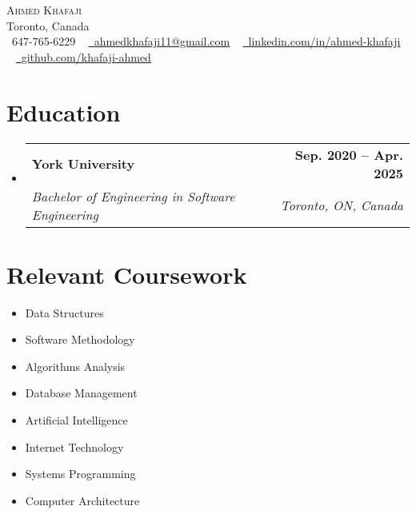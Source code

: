 \documentclass[letterpaper,11pt]{article}
\makeatletter
\newcommand{\resumeItem}[1]{
  \item\small{
    {#1 \vspace{-2pt}}
  }
}
\newcommand{\resumeSubheading}[4]{
  \vspace{-2pt}\item
    \begin{tabular*}{1.0\textwidth}[t]{l@{\extracolsep{\fill}}r}
      \textbf{#1} & \textbf{\small #2} \\
      \textit{\small#3} & \textit{\small #4} \\
    \end{tabular*}\vspace{-7pt}
}
\newcommand{\resumeSubHeadingListStart}{\begin{itemize}[leftmargin=0.0in, label={}]}
\newcommand{\resumeSubHeadingListEnd}{\end{itemize}}
\newcommand{\resumeItemListStart}{\begin{itemize}}
\newcommand{\resumeItemListEnd}{\end{itemize}\vspace{-5pt}}
\makeatother
\begin{document}
\begin{center}
    {\Huge \scshape Ahmed Khafaji} \\ \vspace{1pt}
    Toronto, Canada \\ \vspace{1pt}
    \small \raisebox{-0.1\height}\faPhone\ 647-765-6229 ~ 
    \href{mailto:ahmedkhafaji11@gmail.com}{\raisebox{-0.2\height}\faEnvelope\ \underline{ahmedkhafaji11@gmail.com}} ~ 
    \href{https://linkedin.com/in/ahmed-khafaji}{\raisebox{-0.2\height}\faLinkedin\ \underline{linkedin.com/in/ahmed-khafaji}}  ~
    \href{https://github.com/khafaji-ahmed}{\raisebox{-0.2\height}\faGithub\ \underline{github.com/khafaji-ahmed}}
    \vspace{-8pt}
\end{center}

\section{Education}
  \resumeSubHeadingListStart
    \resumeSubheading
      {York University}{Sep. 2020 -- Apr. 2025}
      {Bachelor of Engineering in Software Engineering}{Toronto, ON, Canada}
  \resumeSubHeadingListEnd

\section{Relevant Coursework}
    \begin{multicols}{4}
        \begin{itemize}[itemsep=-5pt, parsep=3pt]
            \item\small Data Structures
            \item Software Methodology
            \item Algorithms Analysis
            \item Database Management
            \item Artificial Intelligence
            \item Internet Technology
            \item Systems Programming
            \item Computer Architecture
        \end{itemize}
    \end{multicols}
    
\end{document}
